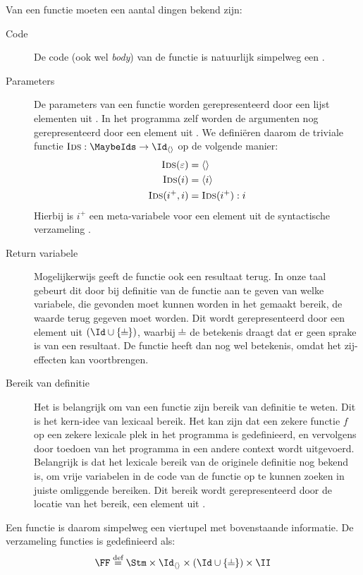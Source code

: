 Van een functie moeten een aantal dingen bekend zijn:
\begin{description}
  \item[Code] De code (ook wel \emph{body}) van de functie is natuurlijk simpelweg een \Stm.
  \item[Parameters] De parameters van een functie worden gerepresenteerd door een lijst elementen uit \Id. In het programma zelf worden de argumenten nog gerepresenteerd door een element uit \MaybeIds. We definiëren daarom de triviale functie $\textsc{Ids} : \MaybeIds \to \Id_{\langle\rangle}$ op de volgende manier:
  \begin{align*}
    \textsc{Ids}(\varepsilon) &= \langle\rangle \\
    \textsc{Ids}(i) &= \langle i \rangle \\
    \textsc{Ids}(i^+, i) &= \textsc{Ids}(i^+) : i
  \end{align*}
  Hierbij is $i^+$ een meta-variabele voor een element uit de syntactische verzameling \Ids.
  \item[Return variabele] Mogelijkerwijs geeft de functie ook een resultaat terug. In onze taal gebeurt dit door bij definitie van de functie aan te geven van welke variabele, die gevonden moet kunnen worden in het gemaakt bereik, de waarde terug gegeven moet worden. Dit wordt gerepresenteerd door een element uit $(\Id \cup \{\nil\})$, waarbij $\nil$ de betekenis draagt dat er geen sprake is van een resultaat. De functie heeft dan nog wel betekenis, omdat het zij-effecten kan voortbrengen.
  \item[Bereik van definitie] Het is belangrijk om van een functie zijn bereik van definitie te weten. Dit is het kern-idee van lexicaal bereik. Het kan zijn dat een zekere functie $f$ op een zekere lexicale plek in het programma is gedefinieerd, en vervolgens door toedoen van het programma in een andere context wordt uitgevoerd. Belangrijk is dat het lexicale bereik van de originele definitie nog bekend is, om vrije variabelen in de code van de functie op te kunnen zoeken in juiste omliggende bereiken. Dit bereik wordt gerepresenteerd door de locatie van het bereik, een element uit \II.
\end{description}

Een functie is daarom simpelweg een viertupel met bovenstaande informatie. De verzameling functies is gedefinieerd als:
\begin{equation*}
  \FF \DEF \Stm \times \Id_{\langle\rangle} \times (\Id \cup \{\nil\}) \times \II
\end{equation*}

